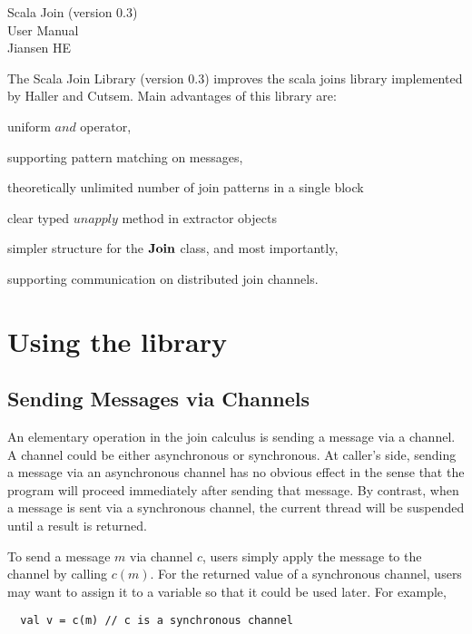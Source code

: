 \begin{center}
\LARGE{Scala Join (version 0.3) \\User Manual}\\

\vspace{10 mm} \large{Jiansen HE}
\end{center}

The Scala Join Library (version 0.3) improves the scala joins library \cite{scala_joins} implemented by Haller and Cutsem.  Main advantages of this library are: 
\begin{inparaenum}[(i)]
  \item uniform $and$ operator,
  \item supporting pattern matching on messages,
  \item theoretically unlimited number of join patterns in a single block
  \item clear typed $unapply$ method in extractor objects
  \item simpler structure for the $\bf{Join}$ class, and most importantly,
  \item supporting communication on distributed join channels.
\end{inparaenum}  

\section{Using the library}
\subsection{Sending Messages via Channels}
An elementary operation in the join calculus is sending a message via a channel.  A channel could be either asynchronous or synchronous.  At caller's side, sending a message via an asynchronous channel has no obvious effect in the sense that the program will proceed immediately after sending that message.  By contrast, when a message is sent via a synchronous channel, the current thread will be suspended until a result is returned.  

To send a message $m$ via channel $c$, users simply apply the message to the channel by calling $c(m)$.  For the returned value of a synchronous channel, users may want to assign it to a variable so that it could be used later.  For example,
\begin{lstlisting}
  val v = c(m) // c is a synchronous channel
\end{lstlisting}

